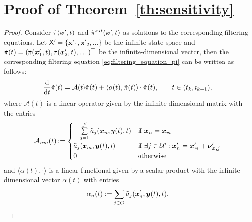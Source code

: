\section{Proof of Theorem~\ref{th:sensitivity}}
\label{sec:FMP_error_proof}
\begin{proof}



Consider $\Tilde{\pi}(\boldsymbol{x}',t)$ and $\Tilde{\pi}^{est} (\boldsymbol{x}', t)$ as solutions to the corresponding filtering equations. Let $\mathsf{X}' = \{ \boldsymbol{x}'_1, \boldsymbol{x}'_2, \dots \}$ be the infinite state space and $\Tilde{\pi}(t) = (\Tilde{\pi}(\boldsymbol{x}'_1, t), \Tilde{\pi}(\boldsymbol{x}'_2, t), \dots )^\top$  be the infinite-dimensional vector, then the corresponding filtering equation \eqref{eq:filtering_equation_pi} can be written as follows:
\begin{equation}
    \label{eq:filtering_pi_matrix}
    \frac{\mathrm{d}}{\mathrm{d} t} \Tilde{\pi}(t) = \mathcal{A}(t) \Tilde{\pi}(t) + \langle \alpha(t), \Tilde{\pi}(t) \rangle \cdot \Tilde{\pi}(t), \qquad t\in(t_k, t_{k+1}),
\end{equation}
where $\mathcal{A}(t)$ is a linear operator given by the infinite-dimensional matrix with the entries
\begin{align*}
    \mathcal{A}_{n m}(t) := 
    \begin{cases}
        - \sum\limits_{j = 1}^{J'} \Tilde{a}_j(\boldsymbol{x}_{n}, \boldsymbol{y}(t), t) & \text{if } \boldsymbol{x}_{n} = \boldsymbol{x}_{m} \\
        \Tilde{a}_j(\boldsymbol{x}_{m}, \boldsymbol{y}(t), t) & \text{if } \exists j \in \mathcal{U}': \boldsymbol{x}_{n}' = \boldsymbol{x}_{m}' + \boldsymbol{\nu}_{\boldsymbol{x}, j}' \\
        0 & \text{otherwise}
    \end{cases}
\end{align*}
and $\langle \alpha(t), \cdot \rangle$ is a linear functional given by a scalar product with the infinite-dimensional vector $\alpha(t)$ with entries
\begin{align*}
    \alpha_n(t) := \sum_{j \in \mathcal{O}} \Tilde{a}_j (\boldsymbol{x}_n', \boldsymbol{y}(t), t).
\end{align*}


\end{proof}
